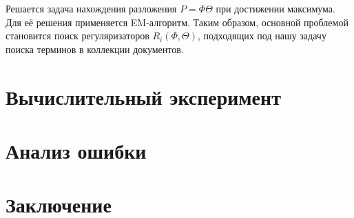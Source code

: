 \documentclass[a4paper, 12pt]{article}
\begin{document}
        Решается задача нахождения разложения $P = \Phi\Theta$ при достижении максимума. Для её решения применяется EM-алгоритм. Таким образом, основной проблемой становится поиск регуляризаторов $R_i(\Phi, \Theta)$, подходящих под нашу задачу поиска терминов в коллекции документов.

\section{Вычислительный эксперимент}

\section{Анализ ошибки}

\section{Заключение}



\end{document}
